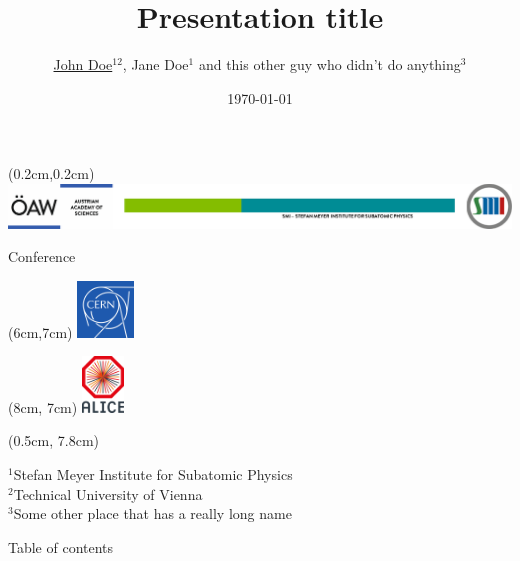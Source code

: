 \documentclass[9pt, aspectratio=169]{beamer}
\author{\underline{John Doe$^{12}$}, Jane Doe$^1$ and this other guy who didn't do anything$^3$}
\title{Presentation title}
\date{\scriptsize \today}
\newcommand{\conference}{\scriptsize Conference}
\begin{document}
\begin{frame}[plain]
    \begin{textblock*}{\textwidth}(0.2cm,0.2cm)
        \includegraphics[width=1.11\textwidth]{smi-template/oeaw-smi-logos.pdf}
    \end{textblock*}
    \vspace{0.8cm}
    \begin{center}
        {\large \bfseries \color{OEAWblue} \inserttitle\par}
        \vspace{1cm}
        
        {\insertauthor\par}
        \vspace{1cm}
        
        {\insertdate\par}
        \conference
    \begin{textblock*}{\textwidth}(6cm,7cm)
        \includegraphics[height=1.5cm]{smi-template/more-logos/cern-logo.png}
    \end{textblock*}
    \begin{textblock*}{\textwidth}(8cm, 7cm)
        \includegraphics[height=1.5cm]{smi-template/more-logos/alice-logo.png}
    \end{textblock*}
    \begin{textblock*}{\textwidth}(0.5cm, 7.8cm)
        \raggedright
        $^1$Stefan Meyer Institute for Subatomic Physics\\
        $^2$Technical University of Vienna\\
        $^3$Some other place that has a really long name
    \end{textblock*}
    \end{center}
\end{frame}
\begin{frame}{Table of contents}
\tableofcontents[sectionstyle=show,
subsectionstyle=show/shaded/hide,
subsubsectionstyle=show/shaded/hide]
\end{frame}
\end{document}
